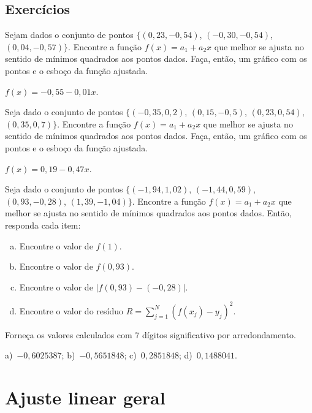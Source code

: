 \subsection*{Exercícios}

\begin{exer}
  Sejam dados o conjunto de pontos $\{(0,23, -0,54)$, $(-0,30, -0,54)$, $(0,04, -0,57)\}$. Encontre a função $f(x) = a_1 + a_2x$ que melhor se ajusta no sentido de mínimos quadrados aos pontos dados. Faça, então, um gráfico com os pontos e o esboço da função ajustada.
\end{exer}
\begin{resp}
    $f(x) = -0,55 -0,01x$.
\end{resp}

\begin{exer}
  Seja dado o conjunto de pontos $\{(-0,35, 0,2)$, $(0,15, -0,5)$, $(0,23, 0,54)$, $(0,35, 0,7)\}$. Encontre a função $f(x) = a_1 + a_2x$ que melhor se ajusta no sentido de mínimos quadrados aos pontos dados. Faça, então, um gráfico com os pontos e o esboço da função ajustada.
\end{exer}
\begin{resp}
    $f(x) = 0,19 - 0,47x$.
\end{resp}

\begin{exer}
  Seja dado o conjunto de pontos $\{(-1,94, 1,02)$, $(-1,44, 0,59)$, $(0,93, -0,28)$, $(1,39, -1,04)\}$. Encontre a função $f(x) = a_1 + a_2x$ que melhor se ajusta no sentido de mínimos quadrados aos pontos dados. Então, responda cada item:
  \begin{enumerate}[a)]
  \item Encontre o valor de $f(1)$.
  \item Encontre o valor de $f(0,93)$.
  \item Encontre o valor de $|f(0,93) - (- 0,28)|$.
  \item Encontre o valor do resíduo $R = \sum_{j=1}^N (f(x_j)-y_j)^2$.
  \end{enumerate}
Forneça os valores calculados com $7$ dígitos significativo por arredondamento.
\end{exer}
\begin{resp}
    a)~$-0,6025387$; b)~$-0,5651848$; c)~$0,2851848$; d)~$0,1488041$.
\end{resp}

\section{Ajuste linear geral}

